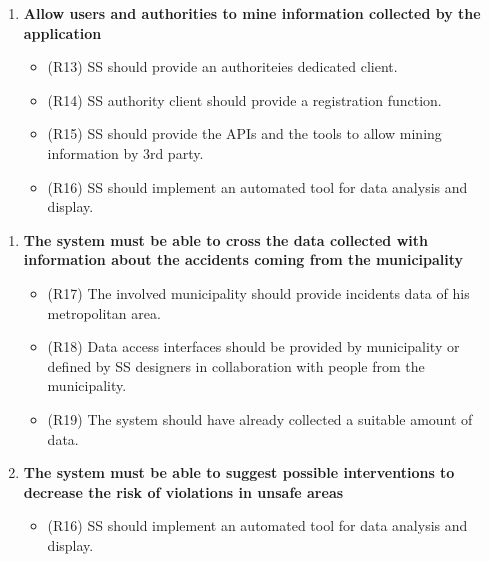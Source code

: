 \begin{enumerate} [label = G\arabic* - ]
\item \textbf{Allow users and authorities to mine information collected by the application}
	\begin{itemize}
	\item (R13) SS should provide an authoriteies dedicated client.
	\item (R14) SS authority client should provide a registration function.
	\item (R15) SS should provide the APIs and the tools to allow mining information by 3rd party.
	\item (R16) SS should implement an automated tool for data analysis and display.
	\end{itemize}
	\bigskip
	\end{enumerate}
	
\begin{enumerate} [label = GA 1.\arabic* - ]

\item \textbf{The system must be able to cross the data collected with information about the accidents coming from the municipality} 
	\begin{itemize}
	\item (R17) The involved municipality should provide incidents data of his metropolitan area.
	\item (R18) Data access interfaces should be provided by municipality or defined by SS designers in collaboration with people from the municipality.
	\item (R19) The system should have already collected a suitable amount of data.
	\end{itemize}
	\bigskip
	
\item\textbf{The system must be able to suggest possible interventions to decrease the risk of violations in unsafe areas}
	\begin{itemize}
	\item (R16) SS should implement an automated tool for data analysis and display.
	\end{itemize}
	\bigskip
\end{enumerate}

